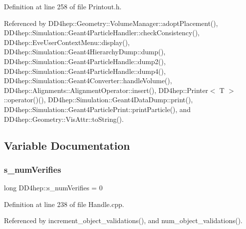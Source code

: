 Definition at line 258 of file Printout.\+h.



Referenced by D\+D4hep\+::\+Geometry\+::\+Volume\+Manager\+::adopt\+Placement(), D\+D4hep\+::\+Simulation\+::\+Geant4\+Particle\+Handler\+::check\+Consistency(), D\+D4hep\+::\+Eve\+User\+Context\+Menu\+::display(), D\+D4hep\+::\+Simulation\+::\+Geant4\+Hierarchy\+Dump\+::dump(), D\+D4hep\+::\+Simulation\+::\+Geant4\+Particle\+Handle\+::dump2(), D\+D4hep\+::\+Simulation\+::\+Geant4\+Particle\+Handle\+::dump4(), D\+D4hep\+::\+Simulation\+::\+Geant4\+Converter\+::handle\+Volume(), D\+D4hep\+::\+Alignments\+::\+Alignment\+Operator\+::insert(), D\+D4hep\+::\+Printer$<$ T $>$\+::operator()(), D\+D4hep\+::\+Simulation\+::\+Geant4\+Data\+Dump\+::print(), D\+D4hep\+::\+Simulation\+::\+Geant4\+Particle\+Print\+::print\+Particle(), and D\+D4hep\+::\+Geometry\+::\+Vis\+Attr\+::to\+String().



\subsection{Variable Documentation}
\hypertarget{namespace_d_d4hep_afc2f0d9d3dc77e8a9b1a06b7cd0404f0}{}\label{namespace_d_d4hep_afc2f0d9d3dc77e8a9b1a06b7cd0404f0} 
\subsubsection{\texorpdfstring{s\+\_\+num\+Verifies}{s\_numVerifies}}
{\footnotesize\ttfamily long D\+D4hep\+::s\+\_\+num\+Verifies = 0\hspace{0.3cm}{\ttfamily [static]}}



Definition at line 238 of file Handle.\+cpp.



Referenced by increment\+\_\+object\+\_\+validations(), and num\+\_\+object\+\_\+validations().

